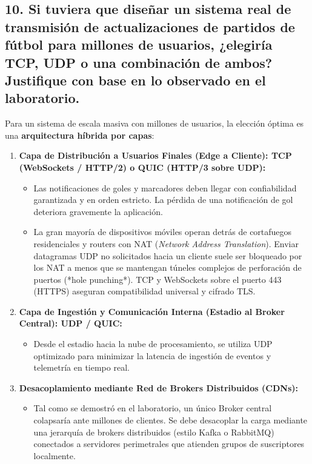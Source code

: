 \documentclass[11pt,a4paper]{article}
\begin{document}
\subsection{10. Si tuviera que diseñar un sistema real de transmisión de actualizaciones de partidos de fútbol para millones de usuarios, ¿elegiría TCP, UDP o una combinación de ambos? Justifique con base en lo observado en el laboratorio.}
Para un sistema de escala masiva con millones de usuarios, la elección óptima es una \textbf{arquitectura híbrida por capas}:
\begin{enumerate}
    \item \textbf{Capa de Distribución a Usuarios Finales (Edge a Cliente): TCP (WebSockets / HTTP/2) o QUIC (HTTP/3 sobre UDP):}
    \begin{itemize}
        \item Las notificaciones de goles y marcadores deben llegar con confiabilidad garantizada y en orden estricto. La pérdida de una notificación de gol deteriora gravemente la aplicación.
        \item La gran mayoría de dispositivos móviles operan detrás de cortafuegos residenciales y routers con NAT (\textit{Network Address Translation}). Enviar datagramas UDP no solicitados hacia un cliente suele ser bloqueado por los NAT a menos que se mantengan túneles complejos de perforación de puertos (*hole punching*). TCP y WebSockets sobre el puerto 443 (HTTPS) aseguran compatibilidad universal y cifrado TLS.
    \end{itemize}
    \item \textbf{Capa de Ingestión y Comunicación Interna (Estadio al Broker Central): UDP / QUIC:}
    \begin{itemize}
        \item Desde el estadio hacia la nube de procesamiento, se utiliza UDP optimizado para minimizar la latencia de ingestión de eventos y telemetría en tiempo real.
    \end{itemize}
    \item \textbf{Desacoplamiento mediante Red de Brokers Distribuidos (CDNs):}
    \begin{itemize}
        \item Tal como se demostró en el laboratorio, un único Broker central colapsaría ante millones de clientes. Se debe desacoplar la carga mediante una jerarquía de brokers distribuidos (estilo Kafka o RabbitMQ) conectados a servidores perimetrales que atienden grupos de suscriptores localmente.
    \end{itemize}
\end{enumerate}
\end{document}
